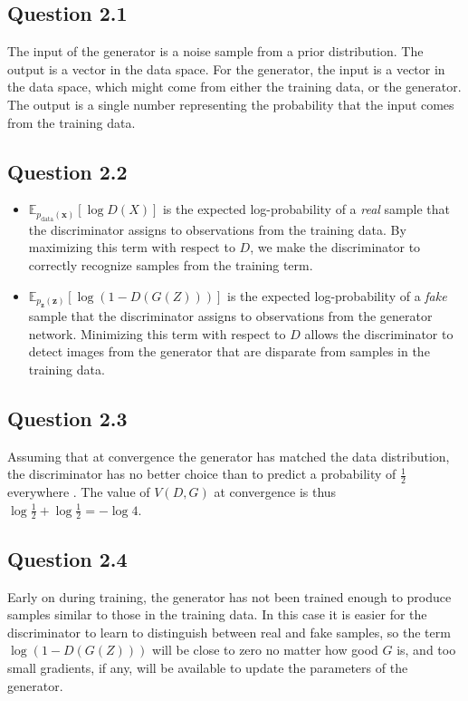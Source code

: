\documentclass{article}
\begin{document}
\subsection*{Question 2.1}

The input of the generator is a noise sample from a prior distribution. The output is a vector in the data space. For the generator, the input is a vector in the data space, which might come from either the training data, or the generator. The output is a single number representing the probability that the input comes from the training data.

\subsection*{Question 2.2}

\begin{itemize}
\item $\mathbb{E}_{p_{\text{data}}(\mathbf{x})}[\log D(X)]$ is the expected log-probability of a \textit{real} sample that the discriminator assigns to observations from the training data. By maximizing this term with respect to $D$, we make the discriminator to correctly recognize samples from the training term.
\item $\mathbb{E}_{p_{\mathbf{z}}(\mathbf{z})}[\log (1-D(G(Z)))]$ is the expected log-probability of a \textit{fake} sample that the discriminator assigns to observations from the generator network. Minimizing this term with respect to $D$ allows the discriminator to detect images from the generator that are disparate from samples in the training data.
\end{itemize}

\subsection*{Question 2.3}

Assuming that at convergence the generator has matched the data distribution, the discriminator has no better choice than to predict a probability of $\tfrac{1}{2}$ everywhere \cite{goodfellow2014generative}. The value of $V(D, G)$ at convergence is thus $\log\tfrac{1}{2} + \log\tfrac{1}{2} = -\log 4$.

\subsection*{Question 2.4}

Early on during training, the generator has not been trained enough to produce samples similar to those in the training data. In this case it is easier for the discriminator to learn to distinguish between real and fake samples, so the term $\log (1-D(G(Z)))$ will be close to zero no matter how good $G$ is, and too small gradients, if any, will be available to update the parameters of the generator.
\end{document}
